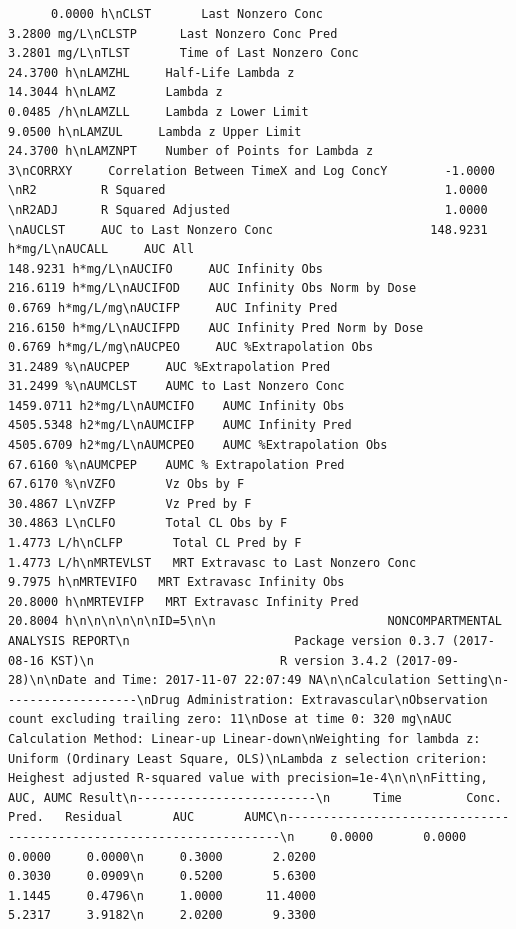 \documentclass[12pt,]{krantz}
\theoremstyle{definition}
\theoremstyle{definition}
\theoremstyle{definition}
\theoremstyle{remark}
\begin{document}
\begin{verbatim}
      0.0000 h\nCLST       Last Nonzero Conc                               3.2800 mg/L\nCLSTP      Last Nonzero Conc Pred                          3.2801 mg/L\nTLST       Time of Last Nonzero Conc                      24.3700 h\nLAMZHL     Half-Life Lambda z                             14.3044 h\nLAMZ       Lambda z                                        0.0485 /h\nLAMZLL     Lambda z Lower Limit                            9.0500 h\nLAMZUL     Lambda z Upper Limit                           24.3700 h\nLAMZNPT    Number of Points for Lambda z                   3\nCORRXY     Correlation Between TimeX and Log ConcY        -1.0000 \nR2         R Squared                                       1.0000 \nR2ADJ      R Squared Adjusted                              1.0000 \nAUCLST     AUC to Last Nonzero Conc                      148.9231 h*mg/L\nAUCALL     AUC All                                       148.9231 h*mg/L\nAUCIFO     AUC Infinity Obs                              216.6119 h*mg/L\nAUCIFOD    AUC Infinity Obs Norm by Dose                   0.6769 h*mg/L/mg\nAUCIFP     AUC Infinity Pred                             216.6150 h*mg/L\nAUCIFPD    AUC Infinity Pred Norm by Dose                  0.6769 h*mg/L/mg\nAUCPEO     AUC %Extrapolation Obs                         31.2489 %\nAUCPEP     AUC %Extrapolation Pred                        31.2499 %\nAUMCLST    AUMC to Last Nonzero Conc                    1459.0711 h2*mg/L\nAUMCIFO    AUMC Infinity Obs                            4505.5348 h2*mg/L\nAUMCIFP    AUMC Infinity Pred                           4505.6709 h2*mg/L\nAUMCPEO    AUMC %Extrapolation Obs                        67.6160 %\nAUMCPEP    AUMC % Extrapolation Pred                      67.6170 %\nVZFO       Vz Obs by F                                    30.4867 L\nVZFP       Vz Pred by F                                   30.4863 L\nCLFO       Total CL Obs by F                               1.4773 L/h\nCLFP       Total CL Pred by F                              1.4773 L/h\nMRTEVLST   MRT Extravasc to Last Nonzero Conc              9.7975 h\nMRTEVIFO   MRT Extravasc Infinity Obs                     20.8000 h\nMRTEVIFP   MRT Extravasc Infinity Pred                    20.8004 h\n\n\n\n\n\nID=5\n\n                        NONCOMPARTMENTAL ANALYSIS REPORT\n                       Package version 0.3.7 (2017-08-16 KST)\n                          R version 3.4.2 (2017-09-28)\n\nDate and Time: 2017-11-07 22:07:49 NA\n\nCalculation Setting\n-------------------\nDrug Administration: Extravascular\nObservation count excluding trailing zero: 11\nDose at time 0: 320 mg\nAUC Calculation Method: Linear-up Linear-down\nWeighting for lambda z: Uniform (Ordinary Least Square, OLS)\nLambda z selection criterion: Heighest adjusted R-squared value with precision=1e-4\n\n\nFitting, AUC, AUMC Result\n-------------------------\n      Time         Conc.      Pred.   Residual       AUC       AUMC\n---------------------------------------------------------------------\n     0.0000       0.0000                           0.0000     0.0000\n     0.3000       2.0200                           0.3030     0.0909\n     0.5200       5.6300                           1.1445     0.4796\n     1.0000      11.4000                           5.2317     3.9182\n     2.0200       9.3300                          
\end{verbatim}
\end{document}
